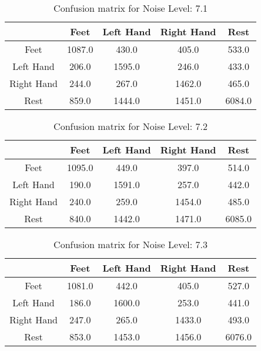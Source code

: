 \begin{table}[!htbp]
    \centering
    \begin{tabular}{|c||c|c|c|c|}
        \hline
		 & Feet & Left Hand & Right Hand & Rest \\
        \hline
        \hline
        Feet & 1087.0 & 430.0 & 405.0 & 533.0 \\
        \hline
        Left Hand & 206.0 & 1595.0 & 246.0 & 433.0 \\
        \hline
        Right Hand & 244.0 & 267.0 & 1462.0 & 465.0 \\
        \hline
        Rest & 859.0 & 1444.0 & 1451.0 & 6084.0 \\
        \hline
    \end{tabular}
    \caption{Confusion matrix for Noise Level: 7.1}
\end{table}

\begin{table}[!htbp]
    \centering
    \begin{tabular}{|c||c|c|c|c|}
        \hline
		 & Feet & Left Hand & Right Hand & Rest \\
        \hline
        \hline
        Feet & 1095.0 & 449.0 & 397.0 & 514.0 \\
        \hline
        Left Hand & 190.0 & 1591.0 & 257.0 & 442.0 \\
        \hline
        Right Hand & 240.0 & 259.0 & 1454.0 & 485.0 \\
        \hline
        Rest & 840.0 & 1442.0 & 1471.0 & 6085.0 \\
        \hline
    \end{tabular}
    \caption{Confusion matrix for Noise Level: 7.2}
\end{table}

\begin{table}[!htbp]
    \centering
    \begin{tabular}{|c||c|c|c|c|}
        \hline
		 & Feet & Left Hand & Right Hand & Rest \\
        \hline
        \hline
        Feet & 1081.0 & 442.0 & 405.0 & 527.0 \\
        \hline
        Left Hand & 186.0 & 1600.0 & 253.0 & 441.0 \\
        \hline
        Right Hand & 247.0 & 265.0 & 1433.0 & 493.0 \\
        \hline
        Rest & 853.0 & 1453.0 & 1456.0 & 6076.0 \\
        \hline
    \end{tabular}
    \caption{Confusion matrix for Noise Level: 7.3}
\end{table}

